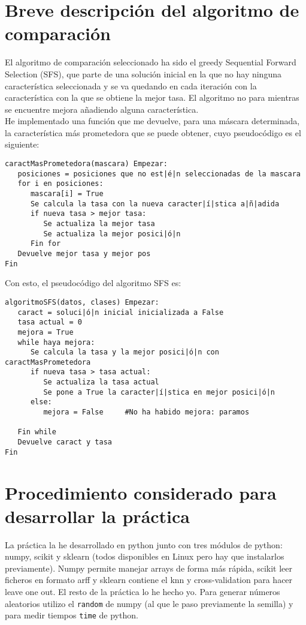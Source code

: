 \documentclass[12pt]{article}
\begin{document}
\section{Breve descripción del algoritmo de comparación}
El algoritmo de comparación seleccionado ha sido el greedy Sequential Forward Selection (SFS), que parte de una solución inicial en la que no hay ninguna característica seleccionada y se va quedando en cada iteración con la característica con la que se obtiene la mejor tasa. El algoritmo no para mientras se encuentre mejora añadiendo alguna característica.\\
He implementado una función que me devuelve, para una máscara determinada, la característica más prometedora que se puede obtener, cuyo pseudocódigo es el siguiente:
\begin{lstlisting}
caractMasPrometedora(mascara) Empezar:
   posiciones = posiciones que no est|é|n seleccionadas de la mascara
   for i en posiciones:
      mascara[i] = True
      Se calcula la tasa con la nueva caracter|í|stica a|ñ|adida
      if nueva tasa > mejor tasa:
         Se actualiza la mejor tasa
         Se actualiza la mejor posici|ó|n
      Fin for
   Devuelve mejor tasa y mejor pos
Fin
\end{lstlisting}

Con esto, el pseudocódigo del algoritmo SFS es:
\begin{lstlisting}
algoritmoSFS(datos, clases) Empezar:
   caract = soluci|ó|n inicial inicializada a False
   tasa actual = 0
   mejora = True
   while haya mejora:
      Se calcula la tasa y la mejor posici|ó|n con caractMasPrometedora
      if nueva tasa > tasa actual:
         Se actualiza la tasa actual
         Se pone a True la caracter|í|stica en mejor posici|ó|n
      else:
         mejora = False		#No ha habido mejora: paramos
      
   Fin while
   Devuelve caract y tasa
Fin

\end{lstlisting}

\newpage

\section{Procedimiento considerado para desarrollar la práctica}
La práctica la he desarrollado en python junto con tres módulos de python: numpy, scikit y sklearn (todos disponibles en Linux pero hay que instalarlos previamente). Numpy permite manejar arrays de forma más rápida, scikit leer ficheros en formato arff y sklearn contiene el knn y cross-validation para hacer leave one out. El resto de la práctica lo he hecho yo. Para generar números aleatorios utilizo el \texttt{random} de numpy (al que le paso previamente la semilla) y para medir tiempos \texttt{time} de python.\\
\end{document}
